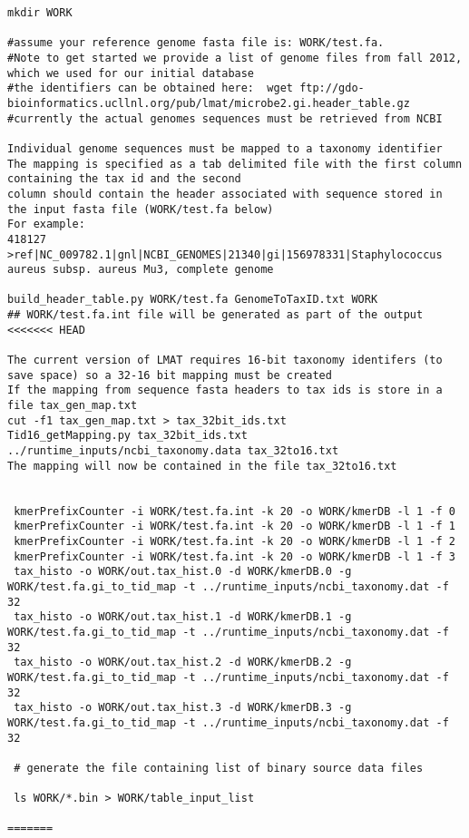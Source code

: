 \documentclass[11pt]{article}
\begin{document}
\begin{verbatim}
mkdir WORK

#assume your reference genome fasta file is: WORK/test.fa.
#Note to get started we provide a list of genome files from fall 2012, which we used for our initial database
#the identifiers can be obtained here:  wget ftp://gdo-bioinformatics.ucllnl.org/pub/lmat/microbe2.gi.header_table.gz
#currently the actual genomes sequences must be retrieved from NCBI

Individual genome sequences must be mapped to a taxonomy identifier
The mapping is specified as a tab delimited file with the first column containing the tax id and the second
column should contain the header associated with sequence stored in the input fasta file (WORK/test.fa below)
For example:
418127   >ref|NC_009782.1|gnl|NCBI_GENOMES|21340|gi|156978331|Staphylococcus aureus subsp. aureus Mu3, complete genome

build_header_table.py WORK/test.fa GenomeToTaxID.txt WORK
## WORK/test.fa.int file will be generated as part of the output
<<<<<<< HEAD

The current version of LMAT requires 16-bit taxonomy identifers (to save space) so a 32-16 bit mapping must be created
If the mapping from sequence fasta headers to tax ids is store in a file tax_gen_map.txt
cut -f1 tax_gen_map.txt > tax_32bit_ids.txt
Tid16_getMapping.py tax_32bit_ids.txt ../runtime_inputs/ncbi_taxonomy.data tax_32to16.txt
The mapping will now be contained in the file tax_32to16.txt


 kmerPrefixCounter -i WORK/test.fa.int -k 20 -o WORK/kmerDB -l 1 -f 0
 kmerPrefixCounter -i WORK/test.fa.int -k 20 -o WORK/kmerDB -l 1 -f 1
 kmerPrefixCounter -i WORK/test.fa.int -k 20 -o WORK/kmerDB -l 1 -f 2
 kmerPrefixCounter -i WORK/test.fa.int -k 20 -o WORK/kmerDB -l 1 -f 3
 tax_histo -o WORK/out.tax_hist.0 -d WORK/kmerDB.0 -g WORK/test.fa.gi_to_tid_map -t ../runtime_inputs/ncbi_taxonomy.dat -f 32
 tax_histo -o WORK/out.tax_hist.1 -d WORK/kmerDB.1 -g WORK/test.fa.gi_to_tid_map -t ../runtime_inputs/ncbi_taxonomy.dat -f 32
 tax_histo -o WORK/out.tax_hist.2 -d WORK/kmerDB.2 -g WORK/test.fa.gi_to_tid_map -t ../runtime_inputs/ncbi_taxonomy.dat -f 32
 tax_histo -o WORK/out.tax_hist.3 -d WORK/kmerDB.3 -g WORK/test.fa.gi_to_tid_map -t ../runtime_inputs/ncbi_taxonomy.dat -f 32

 # generate the file containing list of binary source data files

 ls WORK/*.bin > WORK/table_input_list

=======


\end{verbatim}
\end{document}
